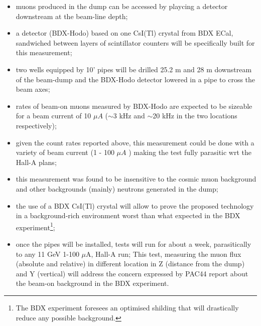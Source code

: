 \begin{itemize}
\item{muons produced in the dump can be accessed by playcing a  detector downstream at the beam-line depth;}
\item{a detector  (BDX-Hodo) based on one CsI(Tl) crystal from  BDX ECal, sandwiched between layers of scintillator counters  will be specifically built for this measurement;}
\item{ two wells equipped by  10' pipes will be drilled  25.2 m and 28 m downstream of the beam-dump and the BDX-Hodo detector lowered in a pipe to cross the beam axes;}
\item{rates of beam-on muons measured by BDX-Hodo are expected  to be sizeable for  a beam current of 10 $\mu A$ ($\sim$3 kHz and $\sim$20 kHz in the two locations respectively);}
\item{given the count rates reported above, this measurement could be done  with a variety of beam current (1 - 100 $\mu A$ ) making the test fully parasitic wrt the Hall-A plans;}
\item{this measurement was found to be insensitive to the cosmic muon background and other backgrounds (mainly) neutrons generated in the dump; }
\item{the use of a BDX CsI(Tl) crystal will allow to prove the proposed technology in a background-rich environment worst than what expected in the BDX experiment\footnote{The BDX experiment foresees  an optimised shilding that will drastically reduce  any possible background.}; }
\item{once the pipes will be installed, tests will run for about a week, parasitically  to  any 11 GeV 1-100 $\mu$A, Hall-A run;} 
This  test, measuring the muon flux (absolute and relative) in different location in Z (distance from the dump) and Y (vertical) will address the concern expressed by PAC44 report about the beam-on background in the BDX experiment.
\end{itemize}

